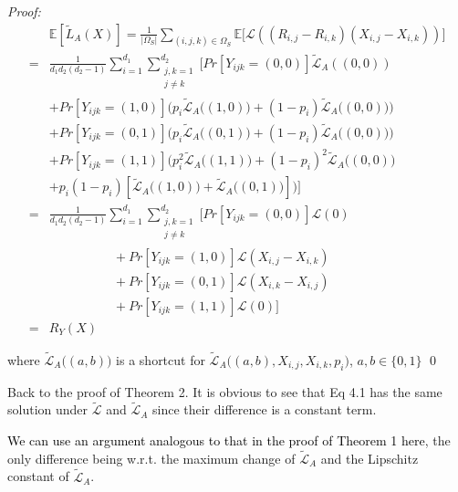 \documentclass{article}
\numberwithin{equation}{section}
\newcommand{\laks}[1]{\textcolor{black}{#1}}
\newtheorem{sampling strategy}{Sampling Strategy}
\begin{document}
\emph{Proof:}
\begin{equation}
    \begin{aligned}
        &\mathbb{E}[\tilde{L}_A(X)]  =  \frac{1}{|\Omega_S|} \sum_{(i,j,k) \in \Omega_S} \mathbb{E}\Big[ \mathcal{L}( (R_{i,j} - R_{i,k})(X_{i,j} - X_{i,k}) ) \Big] \\
         = & \frac{1}{d_1 d_2(d_2-1)} \sum_{i=1}^{d_1} \sum_{\substack{j,k=1\\ j \neq k} }^{d_2} \Big[ Pr[Y_{ijk} = (0,0)] \tilde{\mathcal{L}}_A((0,0))  \\
         & + Pr[Y_{ijk} = (1,0)]\big( p_i \tilde{\mathcal{L}}_A\big((1,0) \big) + (1-p_i) \tilde{\mathcal{L}}_A\big((0,0) \big) \big) \\
         & + Pr[Y_{ijk} = (0,1)]\big( p_i \tilde{\mathcal{L}}_A\big((0,1) \big) + (1-p_i) \tilde{\mathcal{L}}_A\big((0,0) \big) \big) \\
         & + Pr[Y_{ijk} = (1,1)]\big( p_i^2 \tilde{\mathcal{L}}_A\big((1,1) \big) + (1-p_i)^2 \tilde{\mathcal{L}}_A\big((0,0) \big) \\
         & + p_i(1-p_i)[\tilde{\mathcal{L}}_A\big((1,0)\big) + \tilde{\mathcal{L}}_A\big((0,1)\big)]  \big)   \Big] \\
         = & \frac{1}{d_1 d_2(d_2-1)} \sum_{i=1}^{d_1} \sum_{\substack{j,k=1\\ j \neq k} }^{d_2} \Big[ Pr[Y_{ijk} = (0,0)] \mathcal{L}(0) \\
         & \qquad \qquad \quad + Pr[Y_{ijk} = (1,0)] \mathcal{L}(X_{i,j} - X_{i,k}) \\
         & \qquad \qquad \quad + Pr[Y_{ijk} = (0,1)] \mathcal{L}(X_{i,k} - X_{i,j}) \\
         & \qquad \qquad \quad + Pr[Y_{ijk} = (1,1)] \mathcal{L}(0) \Big] \\
         = & R_Y(X)
    \end{aligned}
\end{equation}

where $ \tilde{\mathcal{L}}_A\big((a,b) \big) $ is a shortcut for $\tilde{\mathcal{L}}_A\big( (a,b), X_{i,j}, X_{i,k}, p_i \big)$, $a,b \in \{0,1\}$ \qed

Back to the proof of Theorem 2. It is obvious to see that Eq 4.1 
has the same solution under $\tilde{\mathcal{L}}$ and $\tilde{\mathcal{L}}_A$ since their difference is a constant term.

\laks{We can use an argument analogous to that in the proof of Theorem 1 here}, the only difference being w.r.t.  the maximum change of $\tilde{\mathcal{L}}_A$ and the Lipschitz constant of $\tilde{\mathcal{L}}_A$. 
\end{document}
